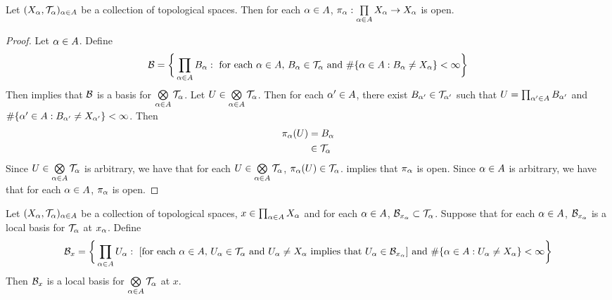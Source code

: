 \documentclass{book}
\begin{document}
	\begin{ex} 
		Let $(X_{\alpha}, \mathcal{T}_{\alpha})_{\alpha \in A}$ be a collection of topological spaces. Then for each $\alpha \in A$, $\pi_{\alpha}: \prod\limits_{\alpha \in A} X_{\alpha} \rightarrow X_{\alpha}$ is open.
	\end{ex}

	\begin{proof}
		Let $\alpha \in A$. Define 
		$$\mathcal{B} = \bigg \{\prod_{\alpha \in A}B_{\alpha}: \text{ for each $\alpha \in A$,  $B_{\alpha} \in \mathcal{T}_{\alpha}$ and $\# \{\alpha \in A: B_{\alpha} \neq X_{\alpha}\} < \infty$} \bigg\}$$
		Then  implies that $\mathcal{B}$ is a basis for $\bigotimes\limits_{\alpha \in A} \mathcal{T}_{\alpha}$. Let $U \in \bigotimes\limits_{\alpha \in A} \mathcal{T}_{\alpha}$. Then for each $\alpha' \in A$, there exist $B_{\alpha'} \in \mathcal{T}_{\alpha'}$ such that $U = \prod_{\alpha' \in A}B_{\alpha'}$ and $\# \{\alpha' \in A: B_{\alpha'} \neq X_{\alpha'}\} < \infty$. Then 
		\begin{align*}
			\pi_{\alpha}(U)
			& = B_{\alpha} \\
			& \in \mathcal{T}_{\alpha}
		\end{align*}
		Since $U \in  \bigotimes\limits_{\alpha \in A} \mathcal{T}_{\alpha}$ is arbitrary, we have that for each $U \in  \bigotimes\limits_{\alpha \in A} \mathcal{T}_{\alpha}$, $\pi_{\alpha}(U) \in \mathcal{T}_{\alpha}$.  implies that $\pi_{\alpha}$ is open. Since $\alpha \in A$ is arbitrary, we have that for each $\alpha \in A$, $\pi_{\alpha}$ is open.
	\end{proof}

	\begin{ex}  
		Let $(X_{\alpha}, \mathcal{T}_{\alpha})_{\alpha \in A}$ be a collection of topological spaces, $x \in \prod_{\alpha \in A}X_{\alpha}$ and for each $\alpha \in A$, $\mathcal{B}_{x_{\alpha}} \subset \mathcal{T}_{\alpha}$. Suppose that for each $\alpha \in A$, $\mathcal{B}_{x_{\alpha}}$ is a local basis for $\mathcal{T}_{\alpha}$ at $x_{\alpha}$. Define 
		$$\mathcal{B}_x = \bigg \{\prod_{\alpha \in A} U_{\alpha}: \text{ [for each $\alpha \in A$, $U_{\alpha} \in \mathcal{T}_{\alpha}$ and $U_{\alpha} \neq X_{\alpha}$ implies that $U_{\alpha} \in \mathcal{B}_{x_{\alpha}}$] and $\# \{\alpha \in A: U_{\alpha} \neq X_{\alpha}\} < \infty$} \bigg\}$$
		Then $\mathcal{B}_x$ is a local basis for $\bigotimes\limits_{\alpha \in A} \mathcal{T}_{\alpha}$ at $x$.
	\end{ex}
\end{document}
